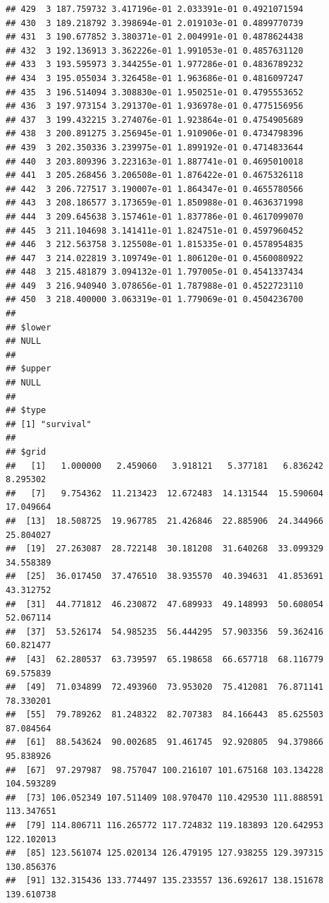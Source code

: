 \documentclass[article]{jss}\usepackage[]{graphicx}\usepackage[]{xcolor}
\makeatletter
\newenvironment{kframe}{%
 \def\at@end@of@kframe{}%
 \ifinner\ifhmode%
  \def\at@end@of@kframe{\end{minipage}}%
  \begin{minipage}{\columnwidth}%
 \fi\fi%
 \def\FrameCommand##1{\hskip\@totalleftmargin \hskip-\fboxsep
 \colorbox{shadecolor}{##1}\hskip-\fboxsep
     \hskip-\linewidth \hskip-\@totalleftmargin \hskip\columnwidth}%
 \MakeFramed {\advance\hsize-\width
   \@totalleftmargin\z@ \linewidth\hsize
   \@setminipage}}%
 {\par\unskip\endMakeFramed%
 \at@end@of@kframe}
\newenvironment{knitrout}{}{} %
\makeatother
\begin{document}
\begin{knitrout}
\begin{kframe}
\begin{verbatim}
## 429  3 187.759732 3.417196e-01 2.033391e-01 0.4921071594
## 430  3 189.218792 3.398694e-01 2.019103e-01 0.4899770739
## 431  3 190.677852 3.380371e-01 2.004991e-01 0.4878624438
## 432  3 192.136913 3.362226e-01 1.991053e-01 0.4857631120
## 433  3 193.595973 3.344255e-01 1.977286e-01 0.4836789232
## 434  3 195.055034 3.326458e-01 1.963686e-01 0.4816097247
## 435  3 196.514094 3.308830e-01 1.950251e-01 0.4795553652
## 436  3 197.973154 3.291370e-01 1.936978e-01 0.4775156956
## 437  3 199.432215 3.274076e-01 1.923864e-01 0.4754905689
## 438  3 200.891275 3.256945e-01 1.910906e-01 0.4734798396
## 439  3 202.350336 3.239975e-01 1.899192e-01 0.4714833644
## 440  3 203.809396 3.223163e-01 1.887741e-01 0.4695010018
## 441  3 205.268456 3.206508e-01 1.876422e-01 0.4675326118
## 442  3 206.727517 3.190007e-01 1.864347e-01 0.4655780566
## 443  3 208.186577 3.173659e-01 1.850988e-01 0.4636371998
## 444  3 209.645638 3.157461e-01 1.837786e-01 0.4617099070
## 445  3 211.104698 3.141411e-01 1.824751e-01 0.4597960452
## 446  3 212.563758 3.125508e-01 1.815335e-01 0.4578954835
## 447  3 214.022819 3.109749e-01 1.806120e-01 0.4560080922
## 448  3 215.481879 3.094132e-01 1.797005e-01 0.4541337434
## 449  3 216.940940 3.078656e-01 1.787988e-01 0.4522723110
## 450  3 218.400000 3.063319e-01 1.779069e-01 0.4504236700
## 
## $lower
## NULL
## 
## $upper
## NULL
## 
## $type
## [1] "survival"
## 
## $grid
##   [1]   1.000000   2.459060   3.918121   5.377181   6.836242   8.295302
##   [7]   9.754362  11.213423  12.672483  14.131544  15.590604  17.049664
##  [13]  18.508725  19.967785  21.426846  22.885906  24.344966  25.804027
##  [19]  27.263087  28.722148  30.181208  31.640268  33.099329  34.558389
##  [25]  36.017450  37.476510  38.935570  40.394631  41.853691  43.312752
##  [31]  44.771812  46.230872  47.689933  49.148993  50.608054  52.067114
##  [37]  53.526174  54.985235  56.444295  57.903356  59.362416  60.821477
##  [43]  62.280537  63.739597  65.198658  66.657718  68.116779  69.575839
##  [49]  71.034899  72.493960  73.953020  75.412081  76.871141  78.330201
##  [55]  79.789262  81.248322  82.707383  84.166443  85.625503  87.084564
##  [61]  88.543624  90.002685  91.461745  92.920805  94.379866  95.838926
##  [67]  97.297987  98.757047 100.216107 101.675168 103.134228 104.593289
##  [73] 106.052349 107.511409 108.970470 110.429530 111.888591 113.347651
##  [79] 114.806711 116.265772 117.724832 119.183893 120.642953 122.102013
##  [85] 123.561074 125.020134 126.479195 127.938255 129.397315 130.856376
##  [91] 132.315436 133.774497 135.233557 136.692617 138.151678 139.610738

\end{verbatim}
\end{kframe}
\end{knitrout}
\end{document}

